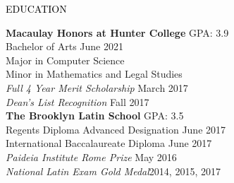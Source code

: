 \documentclass{resume} %
\renewenvironment{rSection}[1]{
\sectionskip
\textcolor{Black}{\MakeUppercase{#1}}
\sectionlineskip
\begin{list}{}{
\setlength{\leftmargin}{1.5em}
}
\item[]
}{
\end{list}
}
\begin{document}
\begin{rSection}{Education}
  \begin{multicols}{2}
    {\bf Macaulay Honors at Hunter College} \hfill GPA: 3.9
    \\ Bachelor of Arts \hfill June 2021
    \\ Major in Computer Science
    \\ Minor in Mathematics and Legal Studies
    \\ {\em Full 4 Year Merit Scholarship} \hfill March 2017
    \\ {\em Dean's List Recognition } \hfill Fall 2017\columnbreak
    \\ {\bf The Brooklyn Latin School} \hfill GPA: 3.5
    \\ Regents Diploma Advanced Designation \hfill June 2017
    \\ International Baccalaureate Diploma \hfill June 2017
    \\ {\em Paideia Institute Rome Prize} \hfill May 2016
    \\ {\em National Latin Exam Gold Medal}\hfill 2014, 2015, 2017
  \end{multicols}
\end{rSection}
\end{document}
